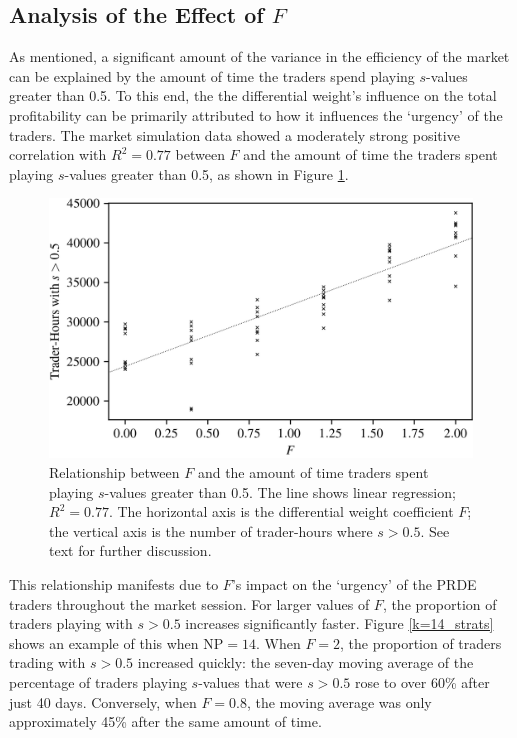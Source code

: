 \documentclass[conference]{IEEEtran}
\begin{document}
\subsection{Analysis of the Effect of $F$}

As mentioned, a significant amount of the variance in the efficiency of the market can be explained by the amount of time the traders spend playing $s$-values greater than 0.5.
To this end, the the differential weight's influence on the total profitability can be primarily attributed to how it influences the `urgency' of the traders.
The market simulation data showed a moderately strong positive correlation with $R^2=0.77$ between $F$ and the amount of time the traders spent playing $s$-values greater than 0.5, as shown in Figure \ref{F_strats}.

\begin{figure}[htbp]
    \centerline{\includegraphics[width=\columnwidth]{F_strats.png}}
    \caption{
        Relationship between $F$ and the amount of time traders spent playing $s$-values greater than 0.5.
        The line shows linear regression; $R^2=0.77$.
        The horizontal axis is the differential weight coefficient $F$; the vertical axis is the number of trader-hours where $s>0.5$.
        See text for further discussion.
    }
    \label{F_strats}
\end{figure}

This relationship manifests due to $F$'s impact on the `urgency' of the PRDE traders throughout the market session.
For larger values of $F$, the proportion of traders playing with $s>0.5$ increases significantly faster.
Figure \ref{k=14_strats} shows an example of this when $\mathrm{NP}=14$.
When $F=2$, the proportion of traders trading with $s>0.5$ increased quickly: the seven-day moving average of the percentage of traders playing $s$-values that were $s>0.5$ rose to over 60\% after just 40 days.
Conversely, when $F=0.8$, the moving average was only approximately 45\% after the same amount of time.
\end{document}
